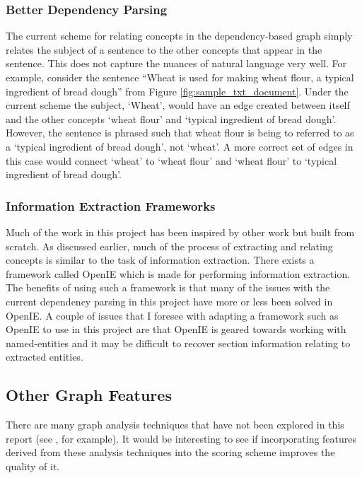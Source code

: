 \documentclass[12pt]{article}
\begin{document}
\subsubsection{Better Dependency Parsing}
The current scheme for relating concepts in the dependency-based graph simply relates the subject of a sentence to the other concepts that appear in the sentence. This does not capture the nuances of natural language very well. For example, consider the sentence ``Wheat is used for making wheat flour, a typical ingredient of bread dough'' from Figure \ref{fig:sample_txt_document}. Under the current scheme the subject, `Wheat', would have an edge created between itself and the other concepts `wheat flour' and `typical ingredient of bread dough'. However, the sentence is phrased such that wheat flour is being to referred to as a `typical ingredient of bread dough', not `wheat'. A more correct set of edges in this case would connect `wheat' to `wheat flour' and `wheat flour' to `typical ingredient of bread dough'. 

\subsubsection{Information Extraction Frameworks} Much of the work in this project has been inspired by other work but built from scratch. As discussed earlier, much of the process of extracting and relating concepts is similar to the task of information extraction. There exists a framework called OpenIE \citep{banko2007open} which is made for performing information extraction. The benefits of using such a framework is that many of the issues with the current dependency parsing in this project have more or less been solved in OpenIE. A couple of issues that I foresee with adapting a framework such as OpenIE to use in this project are that OpenIE is geared towards working with named-entities and it may be difficult to recover section information relating to extracted entities. 


\subsection{Other Graph Features}
There are many graph analysis techniques that have not been explored in this report (see \citep{algorithms_documentation}, for example). It would be interesting to see if incorporating features derived from these analysis techniques into the scoring scheme improves the quality of it.
\end{document}
